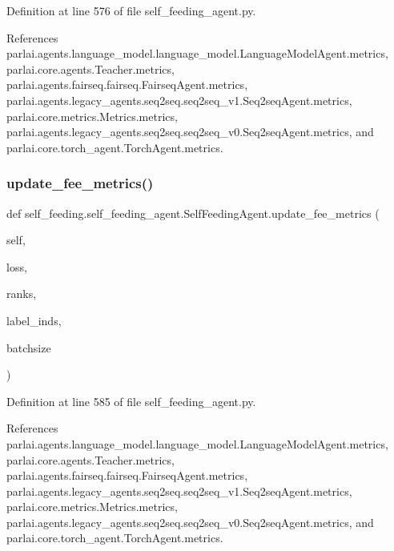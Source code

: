Definition at line 576 of file self\+\_\+feeding\+\_\+agent.\+py.



References parlai.\+agents.\+language\+\_\+model.\+language\+\_\+model.\+Language\+Model\+Agent.\+metrics, parlai.\+core.\+agents.\+Teacher.\+metrics, parlai.\+agents.\+fairseq.\+fairseq.\+Fairseq\+Agent.\+metrics, parlai.\+agents.\+legacy\+\_\+agents.\+seq2seq.\+seq2seq\+\_\+v1.\+Seq2seq\+Agent.\+metrics, parlai.\+core.\+metrics.\+Metrics.\+metrics, parlai.\+agents.\+legacy\+\_\+agents.\+seq2seq.\+seq2seq\+\_\+v0.\+Seq2seq\+Agent.\+metrics, and parlai.\+core.\+torch\+\_\+agent.\+Torch\+Agent.\+metrics.

\mbox{\label{classself__feeding_1_1self__feeding__agent_1_1SelfFeedingAgent_a4a3059142c34335e709642a333cfd0a2}} 
\subsubsection{\texorpdfstring{update\+\_\+fee\+\_\+metrics()}{update\_fee\_metrics()}}
{\footnotesize\ttfamily def self\+\_\+feeding.\+self\+\_\+feeding\+\_\+agent.\+Self\+Feeding\+Agent.\+update\+\_\+fee\+\_\+metrics (\begin{DoxyParamCaption}\item[{}]{self,  }\item[{}]{loss,  }\item[{}]{ranks,  }\item[{}]{label\+\_\+inds,  }\item[{}]{batchsize }\end{DoxyParamCaption})}



Definition at line 585 of file self\+\_\+feeding\+\_\+agent.\+py.



References parlai.\+agents.\+language\+\_\+model.\+language\+\_\+model.\+Language\+Model\+Agent.\+metrics, parlai.\+core.\+agents.\+Teacher.\+metrics, parlai.\+agents.\+fairseq.\+fairseq.\+Fairseq\+Agent.\+metrics, parlai.\+agents.\+legacy\+\_\+agents.\+seq2seq.\+seq2seq\+\_\+v1.\+Seq2seq\+Agent.\+metrics, parlai.\+core.\+metrics.\+Metrics.\+metrics, parlai.\+agents.\+legacy\+\_\+agents.\+seq2seq.\+seq2seq\+\_\+v0.\+Seq2seq\+Agent.\+metrics, and parlai.\+core.\+torch\+\_\+agent.\+Torch\+Agent.\+metrics.



